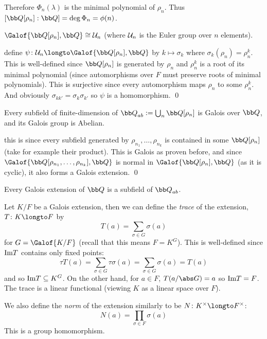 Therefore $\Phi_n(\lambda)$ is the minimal polynomial of $\rho_n$.
Thus $[{\bb Q}[\rho_n]:{\bb Q}]=\deg\Phi_n=\phi(n)$.

\bprop

    $\Galof{{\bb Q}[\rho_n],{\bb Q}}\cong{\cal U}_n$ (where ${\cal U}_n$ is the Euler group over $n$ elements).

\eprop

\Proof define $\psi\colon{\cal U}_n\longto\Galof{{\bb Q}[\rho_n],{\bb Q}}$ by $k\mapsto\sigma_k$ where $\sigma_k(\rho_n)=\rho_n^k$.
This is well-defined since ${\bb Q}[\rho_n]$ is generated by $\rho_n$ and $\rho_n^k$ is a root of its minimal polynomial (since automorphisms over $F$ must preserve roots of minimal polynomials).
This is surjective since every automorphism maps $\rho_n$ to some $\rho_n^k$.
And obviously $\sigma_{kk'}=\sigma_k\sigma_{k'}$ so $\psi$ is a homomorphism.
\qed

\bcoro

    Every subfield of finite-dimension of ${\bb Q}_{ab}\coloneqq\bigcup_n{\bb Q}[\rho_n]$ is Galois over ${\bb Q}$, and its Galois group is Abelian.

\ecoro

\Proof this is since every subfield generated by $\rho_{n_1},\dots,\rho_{n_k}$ is contained in some ${\bb Q}[\rho_n]$ (take for example their product).
This is Galois as proven before, and since $\Galof{{\bb Q}[\rho_{n_1},\dots,\rho_{n_k}],{\bb Q}}$ is normal in $\Galof{{\bb Q}[\rho_n],{\bb Q}}$ (as it is cyclic), it also forms a Galois extension.
\qed

\bthrm[title=Kronecker-Weber Theorem]

    Every Galois extension of ${\bb Q}$ is a subfield of ${\bb Q}_{ab}$.

\ethrm

Let $K/F$ be a Galois extension, then we can define the {\it trace} of the extension, $T\colon K\longto F$ by
$$ T(a) = \sum_{\sigma\in G}\sigma(a) $$
for $G=\Galof{K/F}$ (recall that this means $F=K^G$).
This is well-defined since ${\rm Im}T$ contains only fixed points:
$$ \tau T(a) = \sum_{\sigma\in G}\tau\sigma(a) = \sum_{\sigma\in G}\sigma(a) = T(a) $$
and so ${\rm Im}T\subseteq K^G$.
On the other hand, for $a\in F$, $T(a/\abs G)=a$ so ${\rm Im}T=F$.
The trace is a linear functional (viewing $K$ as a linear space over $F$).

We also define the {\it norm} of the extension similarly to be $N\colon K^\times\longto F^\times$:
$$ N(a) = \prod_{\sigma\in F}\sigma(a) $$
This is a group homomorphism.

